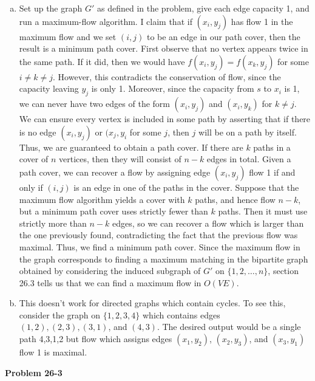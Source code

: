 \documentclass{article}
\begin{document}
\begin{enumerate}[a.]
\item Set up the graph $G'$ as defined in the problem, give each edge capacity 1, and run a maximum-flow algorithm.  I claim that if $(x_i, y_j)$ has flow 1 in the maximum flow and we set $(i,j)$ to be an edge in our path cover, then the result is a minimum path cover.  First observe that no vertex appears twice in the same path.  If it did, then we would have $f(x_i, y_j) = f(x_k,y_j)$ for some $i \neq k \neq j$.  However, this contradicts the conservation of flow, since the capacity leaving $y_j$ is only 1.  Moreover, since the capacity from $s$ to $x_i$ is 1, we can never have two edges of the form $(x_i, y_j)$ and $(x_i, y_k)$ for $k \neq j$.  We can ensure every vertex is included in some path by asserting that if there is no edge $(x_i,y_j)$ or $(x_j, y_i$ for some $j$, then $j$ will be on a path by itself.  Thus, we are guaranteed to obtain a path cover.  If there are $k$ paths in a cover of $n$ vertices, then they will consist of $n-k$ edges in total.  Given a path cover, we can recover a flow by assigning edge $(x_i, y_j)$ flow 1 if and only if $(i,j)$ is an edge in one of the paths in the cover.  Suppose that the maximum flow algorithm yields a cover with $k$ paths, and hence flow $n-k$, but a minimum path cover uses strictly fewer than $k$ paths.  Then it must use strictly more than $n-k$ edges, so we can recover a flow which is larger than the one previously found, contradicting the fact that the previous flow was maximal.  Thus, we find a minimum path cover.  Since the maximum flow in the graph corresponds to finding a maximum matching in the bipartite graph obtained by considering the induced subgraph of $G'$ on $\{1,2,\ldots, n\}$, section 26.3 tells us that we can find a maximum flow in $O(VE)$. 

\item This doesn't work for directed graphs which contain cycles.  To see this, consider the graph on $\{1,2,3,4\}$ which contains edges $(1,2), (2,3), (3,1)$, and $(4,3)$.  The desired output would be a single path 4,3,1,2 but flow which assigns edges $(x_1,y_2)$, $(x_2,y_3)$, and $(x_3,y_1)$ flow 1 is maximal. 
\end{enumerate}

\noindent\textbf{Problem 26-3}\\
\end{document}
